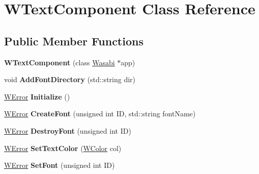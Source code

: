 \hypertarget{class_w_text_component}{}\section{W\+Text\+Component Class Reference}
\label{class_w_text_component}
\subsection*{Public Member Functions}
\begin{DoxyCompactItemize}
\item 
{\bfseries W\+Text\+Component} (class \hyperlink{class_wasabi}{Wasabi} $\ast$app)\hypertarget{class_w_text_component_a61b7a0a976a6bab65937aa634a49daf1}{}\label{class_w_text_component_a61b7a0a976a6bab65937aa634a49daf1}

\item 
void {\bfseries Add\+Font\+Directory} (std\+::string dir)\hypertarget{class_w_text_component_a6e75f75e6239cf12d9faf0cb4911ecd0}{}\label{class_w_text_component_a6e75f75e6239cf12d9faf0cb4911ecd0}

\item 
\hyperlink{class_w_error}{W\+Error} {\bfseries Initialize} ()\hypertarget{class_w_text_component_af058bfd7021ea60f724d0e650faeaf24}{}\label{class_w_text_component_af058bfd7021ea60f724d0e650faeaf24}

\item 
\hyperlink{class_w_error}{W\+Error} {\bfseries Create\+Font} (unsigned int ID, std\+::string font\+Name)\hypertarget{class_w_text_component_a6381c19b7c3b17108e9b4d244999955a}{}\label{class_w_text_component_a6381c19b7c3b17108e9b4d244999955a}

\item 
\hyperlink{class_w_error}{W\+Error} {\bfseries Destroy\+Font} (unsigned int ID)\hypertarget{class_w_text_component_aca27e939664f8e1ffa392e8d361103b7}{}\label{class_w_text_component_aca27e939664f8e1ffa392e8d361103b7}

\item 
\hyperlink{class_w_error}{W\+Error} {\bfseries Set\+Text\+Color} (\hyperlink{class_w_color}{W\+Color} col)\hypertarget{class_w_text_component_aaa045f9cc46861a90f048fb0bf959ff1}{}\label{class_w_text_component_aaa045f9cc46861a90f048fb0bf959ff1}

\item 
\hyperlink{class_w_error}{W\+Error} {\bfseries Set\+Font} (unsigned int ID)\hypertarget{class_w_text_component_aaf7f72c29da9d6085e814d9099498177}{}\label{class_w_text_component_aaf7f72c29da9d6085e814d9099498177}


\end{DoxyCompactItemize}
